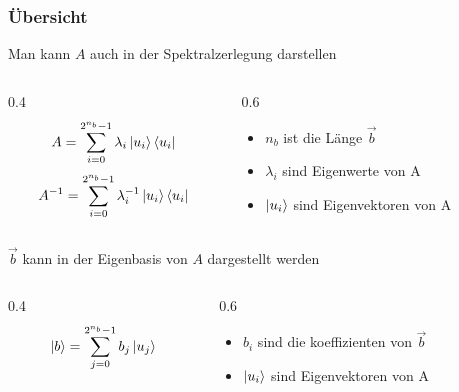 \section{}

\begin{frame}
    \frametitle{Übersicht}

        \hfil

        Man kann $A$ auch in der Spektralzerlegung darstellen

        \begin{columns}[c]
            \begin{column}{0.4\hsize}\centering
            $$A = \sum_{i=0}^{2^{n_b}-1} \lambda_i \ket{u_i}\bra{u_i}$$
            $$A^{-1} = \sum_{i=0}^{2^{n_b}-1} \lambda_i^{-1} \ket{u_i}\bra{u_i}$$
            \end{column}

            \begin{column}{0.6\hsize}
            \begin{itemize}
            \item   $n_b$ ist die Länge $\vec{b}$ 
            \item   $\lambda_i$ sind Eigenwerte von A
            \item   $\ket{u_i}$ sind Eigenvektoren von A
            \end{itemize}
 
            \end{column}
        \end{columns}

        \hfil

        \hfil

        $\vec{b}$ kann in der Eigenbasis von $A$ dargestellt werden 

        \begin{columns}[c]
            \begin{column}{0.4\hsize}\centering
            $$\ket{b} = \sum_{j=0}^{2^{n_b}-1} b_j\ket{u_j}$$
            \end{column}
            \begin{column}{0.6\hsize}
            \begin{itemize}
            \item   $b_i$ sind die koeffizienten von $\vec{b}$
            \item   $\ket{u_i}$ sind Eigenvektoren von A
            \end{itemize}
 
            \end{column}
        \end{columns}



\end{frame}


